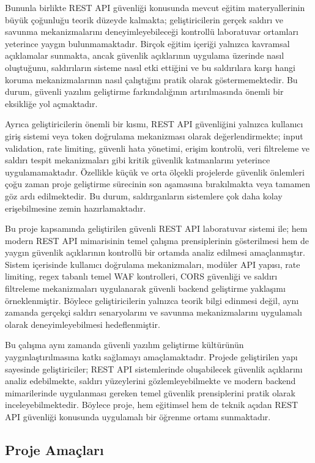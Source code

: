 Bununla birlikte REST API güvenliği konusunda mevcut eğitim materyallerinin büyük çoğunluğu teorik düzeyde kalmakta; geliştiricilerin gerçek saldırı ve savunma mekanizmalarını deneyimleyebileceği kontrollü laboratuvar ortamları yeterince yaygın bulunmamaktadır. Birçok eğitim içeriği yalnızca kavramsal açıklamalar sunmakta, ancak güvenlik açıklarının uygulama üzerinde nasıl oluştuğunu, saldırıların sisteme nasıl etki ettiğini ve bu saldırılara karşı hangi koruma mekanizmalarının nasıl çalıştığını pratik olarak göstermemektedir. Bu durum, güvenli yazılım geliştirme farkındalığının artırılmasında önemli bir eksikliğe yol açmaktadır.

Ayrıca geliştiricilerin önemli bir kısmı, REST API güvenliğini yalnızca kullanıcı giriş sistemi veya token doğrulama mekanizması olarak değerlendirmekte; input validation, rate limiting, güvenli hata yönetimi, erişim kontrolü, veri filtreleme ve saldırı tespit mekanizmaları gibi kritik güvenlik katmanlarını yeterince uygulamamaktadır. Özellikle küçük ve orta ölçekli projelerde güvenlik önlemleri çoğu zaman proje geliştirme sürecinin son aşamasına bırakılmakta veya tamamen göz ardı edilmektedir. Bu durum, saldırganların sistemlere çok daha kolay erişebilmesine zemin hazırlamaktadır.

Bu proje kapsamında geliştirilen güvenli REST API laboratuvar sistemi ile; hem modern REST API mimarisinin temel çalışma prensiplerinin gösterilmesi hem de yaygın güvenlik açıklarının kontrollü bir ortamda analiz edilmesi amaçlanmıştır. Sistem içerisinde kullanıcı doğrulama mekanizmaları, modüler API yapısı, rate limiting, regex tabanlı temel WAF kontrolleri, CORS güvenliği ve saldırı filtreleme mekanizmaları uygulanarak güvenli backend geliştirme yaklaşımı örneklenmiştir. Böylece geliştiricilerin yalnızca teorik bilgi edinmesi değil, aynı zamanda gerçekçi saldırı senaryolarını ve savunma mekanizmalarını uygulamalı olarak deneyimleyebilmesi hedeflenmiştir.

Bu çalışma aynı zamanda güvenli yazılım geliştirme kültürünün yaygınlaştırılmasına katkı sağlamayı amaçlamaktadır. Projede geliştirilen yapı sayesinde geliştiriciler; REST API sistemlerinde oluşabilecek güvenlik açıklarını analiz edebilmekte, saldırı yüzeylerini gözlemleyebilmekte ve modern backend mimarilerinde uygulanması gereken temel güvenlik prensiplerini pratik olarak inceleyebilmektedir. Böylece proje, hem eğitimsel hem de teknik açıdan REST API güvenliği konusunda uygulamalı bir öğrenme ortamı sunmaktadır.

\subsection{Proje Amaçları}
\label{proje-ama-lar}


